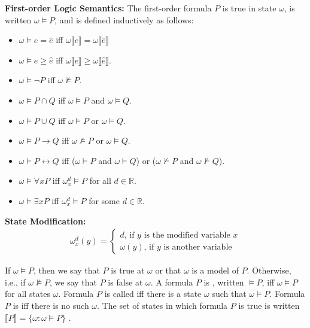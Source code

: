 \textbf{First-order Logic Semantics:}
The first-order formula $P$ is true in state $\omega$, 
is written $\omega \vDash P$, and is defined inductively as follows:
\vspace{-.5cm}
\begin{itemize}
  \item $\omega \vDash e = \hat{e}$ iff 
    $\omega \llbracket e \rrbracket = \omega\llbracket\hat{e}\rrbracket$
  \item $\omega \vDash e \geq \hat{e}$ iff
    $\omega\llbracket e \rrbracket \geq \omega\llbracket \hat{e} \rrbracket$.
  \item $\omega \vDash \neg P$ iff 
    $\omega \nvDash P$. 
  \item $\omega \vDash P \cap Q$ iff 
    $\omega \vDash P$ and $\omega \vDash Q$.
  \item $\omega \vDash P \cup Q$ iff 
    $\omega \vDash P$ or $\omega \vDash Q$.
  \item $\omega \vDash P \rightarrow Q$ iff 
    $\omega \nvDash P$ or $\omega \vDash Q$.
  \item $\omega \vDash P \leftrightarrow Q$ iff 
    ($\omega \vDash P$ and $\omega \vDash Q$) or 
    ($\omega \nvDash P$ and $\omega \nvDash Q$).
  \item $\omega \vDash \forall x P$ iff 
    $\omega^d_x \vDash P$ for all $d \in \mathds{R}$. 
  \item $\omega \vDash \exists x P$ iff 
    $\omega^d_x \vDash P$ for some $d \in \mathds{R}$.
\end{itemize}
\vspace{-.5cm}
\textbf{State Modification:}
\begin{align*}
  \omega^d_x(y) = 
  \begin{cases} 
    d \text{, if } y \text{ is the modified variable } x \\
    \omega(y) \text{, if } y \text{ is another variable}
  \end{cases}
\end{align*}

If $\omega \vDash P$, then we say that $P$ is true at $\omega$ 
or that $\omega$ is a model of $P$. 
Otherwise, i.e., if $\omega \nvDash P$, we say that $P$ is false at $\omega$. 
A formula $P$ is , written $\vDash P$, 
iff $\omega \vDash P$ for all states $\omega$. 
Formula $P$ is called  
iff there is a state $\omega$ such that $\omega \vDash P$. 
Formula $P$ is  
iff there is no such $\omega$. 
The set of states in which formula $P$ is true is written 
$\llbracket P \rrbracket = \{ \omega : \omega \vDash P \}$ .

